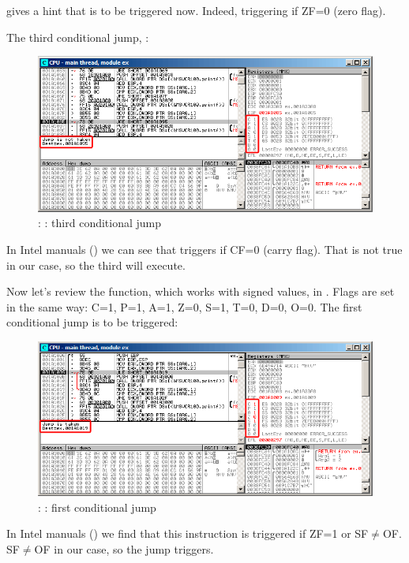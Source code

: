 \olly gives a hint that \JNZ is to be triggered now.
Indeed, \JNZ triggering if ZF=0 (zero flag).

\clearpage
The third conditional jump, \JNB:

\begin{figure}[H]
\centering
\includegraphics[scale=\FigScale]{patterns/07_jcc/simple/olly_unsigned3.png}
\caption{\olly: : third conditional jump}
\label{fig:jcc_olly_unsigned_3}
\end{figure}

In Intel manuals () we can see that \JNB triggers if CF=0 (carry flag).
That is not true in our case, so the third \printf will execute.

\clearpage
Now let's review the  function, which works with signed values, in \olly.
Flags are set in the same way: C=1, P=1, A=1, Z=0, S=1, T=0, D=0, O=0.
The first conditional jump \JLE is to be triggered:

\begin{figure}[H]
\centering
\includegraphics[scale=\FigScale]{patterns/07_jcc/simple/olly_signed1.png}
\caption{\olly: : first conditional jump}
\label{fig:jcc_olly_signed_1}
\end{figure}

In Intel manuals () we find that this instruction is triggered if ZF=1 or SF$\neq$OF.
SF$\neq$OF in our case, so the jump triggers.

